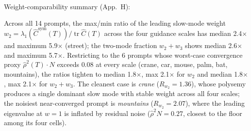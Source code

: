 Weight-comparability summary (App.~H):

Across all 14 prompts, the max/min ratio of the leading slow-mode weight
$w_2 = \lambda_1(\hat C^{\mathrm{sym}}(T))/\operatorname{tr}\hat C(T)$ across the four
guidance scales has median 2.4$\times$ and maximum
5.9$\times$ (street); the two-mode fraction $w_2+w_3$ shows median
2.6$\times$ and maximum 5.7$\times$.
Restricting to the 6 prompts whose worst-case convergence proxy
$\hat\rho^2(T)\cdot N$ exceeds $0.08$ at every scale
(crane, car, mouse, palm, bat, mountains),
the ratios tighten to median 1.8$\times$, max
2.1$\times$ for $w_2$ and median 1.8$\times$,
max 2.1$\times$ for $w_2+w_3$.
The cleanest case is \textit{crane} ($R_{w_2}=1.36$),
whose polysemy produces a single dominant slow mode with stable weight across
all four scales; the noisiest near-converged prompt is
\textit{mountains} ($R_{w_2}=2.07$),
where the leading eigenvalue at $w=1$ is inflated by residual noise
($\hat\rho^2 N=0.27$, closest to
the floor among its four cells).
